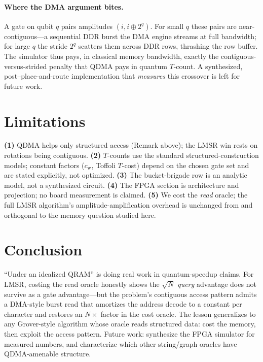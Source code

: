 \documentclass[11pt]{article}
\theoremstyle{definition}
\begin{document}
\paragraph{Where the DMA argument bites.} A gate on qubit $q$ pairs amplitudes
$(i, i\oplus 2^q)$. For small $q$ these pairs are near-contiguous---a sequential
DDR burst the DMA engine streams at full bandwidth; for large $q$ the stride
$2^q$ scatters them across DDR rows, thrashing the row buffer. The simulator thus
pays, in classical memory bandwidth, exactly the contiguous-versus-strided penalty
that QDMA pays in quantum $T$-count. A synthesized, post--place-and-route
implementation that \emph{measures} this crossover is left for future work.

\section{Limitations}
\label{sec:limitations}
\textbf{(1)} QDMA helps only structured access (Remark above); the LMSR win rests
on rotations being contiguous. \textbf{(2)} $T$-counts use the standard
structured-construction models; constant factors ($c_{\mathrm{w}}$, Toffoli $T$-cost)
depend on the chosen gate set and are stated explicitly, not optimized.
\textbf{(3)} The bucket-brigade row is an analytic model, not a synthesized
circuit. \textbf{(4)} The FPGA section is architecture and projection; no board
measurement is claimed. \textbf{(5)} We cost the \emph{read} oracle; the full LMSR
algorithm's amplitude-amplification overhead is unchanged from \cite{pham2025lmsr}
and orthogonal to the memory question studied here.

\section{Conclusion}
\label{sec:conclusion}
``Under an idealized QRAM'' is doing real work in quantum-speedup claims. For LMSR,
costing the read oracle honestly shows the $\sqrt{N}$ \emph{query} advantage does
not survive as a gate advantage---but the problem's contiguous access pattern
admits a DMA-style burst read that amortizes the address decode to a constant per
character and restores an $N\times$ factor in the cost oracle. The lesson
generalizes to any Grover-style algorithm whose oracle reads structured data: cost
the memory, then exploit the access pattern. Future work: synthesize the FPGA
simulator for measured numbers, and characterize which other string/graph oracles
have QDMA-amenable structure.
\end{document}
